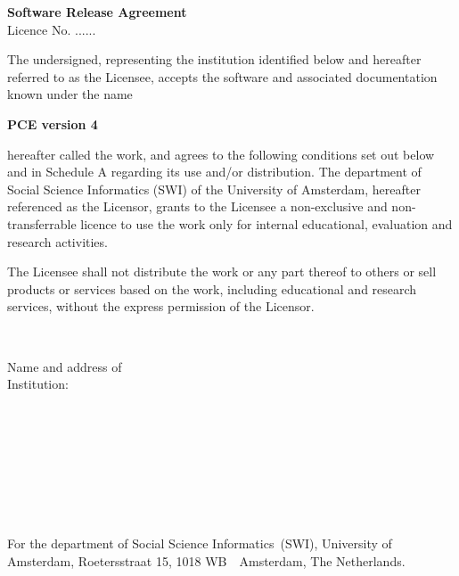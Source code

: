\setlength{\parindent}{0in}
\setlength{\parskip}{5pt}
\nofiles

\begin{center}
    { \Large \bf Software Release Agreement } \\
    \vspace{1cm}
    { Licence No. ...... }
    \vspace{1.5cm}
\end{center}

The undersigned, representing the institution identified below and
hereafter referred to as the Licensee, accepts the software and
associated documentation known under the name

\vspace{5mm}
\centerline{\Large \bf PCE version 4}
\vspace{5mm}

hereafter called the work, and agrees to the following conditions set
out below and in Schedule A regarding its use and/or distribution. The
department of Social Science Informatics (SWI) of the University of
Amsterdam, hereafter referenced as the Licensor, grants to the Licensee
a non-exclusive and non-transferrable licence to use the work only for
internal educational, evaluation and research activities.

The Licensee shall not distribute the work or any part thereof to
others or sell products or services based on the work, including
educational and research services, without the express permission of the
Licensor.

\newlength{\tag}
\settowidth{\tag}{Authorised Signature: }
\newlength{\rest}
\setlength{\rest}{\textwidth}
\addtolength{\rest}{-\tag}

\newcommand{\fillin}{\dotfill\mbox{}}
\newcommand{\onlydots}{\mbox{}\fillin}
\newcommand{\next}{\\[5mm]}

\vspace{0.5cm}
\fillin \next
\parbox[t]{\tag}{Name and address of \\ Institution:}%
\parbox[t]{\rest}{\onlydots \next \onlydots \next \onlydots} \next
{}\fillin \next
{}\fillin \next
{}\fillin \next
\vspace{0.3cm}

For the department of Social Science Informatics~(SWI), University of
Amsterdam, Roetersstraat 15, 1018 WB~~Amsterdam, The Netherlands. 
\vspace{1cm}

